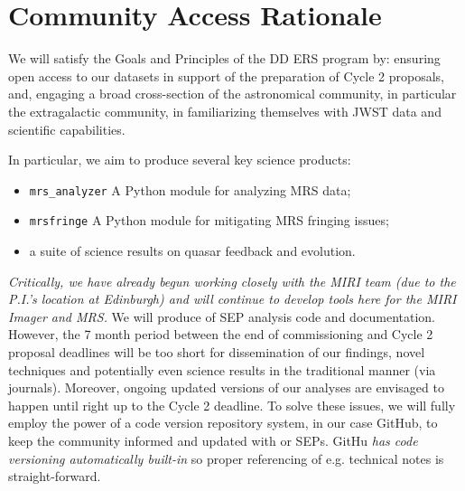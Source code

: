 \section*{Community Access Rationale}
\noindent
We will satisfy the Goals and Principles of the DD ERS program by:
ensuring open access to our datasets in support of the preparation of Cycle 2 proposals, and, 
engaging a broad cross-section of the astronomical community, in particular the extragalactic community, in familiarizing themselves with JWST data and scientific capabilities.

\noindent
In particular, we aim to produce several key science products:
\begin{itemize}
\item {\tt mrs\_analyzer} A Python module for analyzing MRS data; 
\item {\tt mrsfringe} A Python module for mitigating MRS fringing issues; 
\item a suite of science results on quasar feedback and evolution. 
\end{itemize}

\noindent
{\it Critically, we have already begun working closely with the MIRI team (due to the P.I.'s location at Edinburgh) and will continue to develop tools here for the MIRI Imager and MRS.}
We will produce of SEP analysis code and documentation.  However, the 7
month period between the end of commissioning and Cycle 2 proposal
deadlines will be too short for dissemination of our findings, novel
techniques and potentially even science results in the traditional
manner (via journals). Moreover, ongoing updated versions 
of our analyses are envisaged to happen until right up to the Cycle 2 deadline. 
To solve these issues, we will fully employ the power of a code version
repository system, in our case GitHub, to keep the community informed
and updated with or SEPs. GitHu {\it has code versioning automatically
built-in} so proper referencing of e.g. technical notes is straight-forward. 






